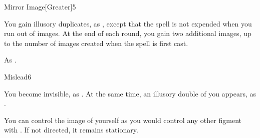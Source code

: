 \begin{spellsection}{Mirror Image}[Greater]{5}
\begin{spellheader}
\end{spellheader}
\begin{spellcontent}
    \begin{spelltargetinginfo}
    \end{spelltargetinginfo}
    \begin{spelleffects}
        \spelleffect You gain illusory duplicates, as , except that the spell is not expended when you run out of images. At the end of each round, you gain two additional images, up to the number of images created when the spell is first cast.
        \spelldur \durshort \dismissable
    \end{spelleffects}
\end{spellcontent}
\begin{spellfooter}
    \spellnotes As .
\end{spellfooter}
\end{spellsection}

\begin{spellsection}{Mislead}{6}
\begin{spellheader}
\end{spellheader}
\begin{spellcontent}
    \begin{spelltargetinginfo}
    \end{spelltargetinginfo}
    \begin{spelleffects}
        \spelleffect You become invisible, as . At the same time, an illusory double of you appears, as .

        You can control the image of yourself as you would control any other figment with . If not directed, it remains stationary.
        \spelldur \durshort \dismissable
    \end{spelleffects}
\end{spellcontent}
\begin{spellfooter}
\end{spellfooter}
\end{spellsection}

